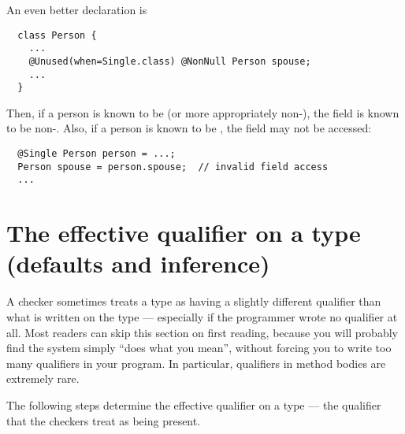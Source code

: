 An even better declaration is

\begin{Verbatim}
  class Person {
    ...
    @Unused(when=Single.class) @NonNull Person spouse;
    ...
  }
\end{Verbatim}

Then, if a person is known to be  (or more
appropriately non-), the  field is known to
be non-.  Also, if a person is known to be ,
the  field may not be accessed:

\begin{Verbatim}
  @Single Person person = ...;
  Person spouse = person.spouse;  // invalid field access
  ...
\end{Verbatim}


\section{The effective qualifier on a type (defaults and inference)\label{effective-qualifier}}

A checker sometimes treats a type as having a slightly different qualifier
than what is written on the type --- especially if the programmer wrote no
qualifier at all.
Most readers can skip this section on first reading, because you will
probably find the system simply ``does what you mean'', without forcing
you to write too many qualifiers in your program.
In particular, qualifiers in method bodies are extremely rare.

  The following steps determine the effective
qualifier on a type --- the qualifier that the checkers treat as being present.

